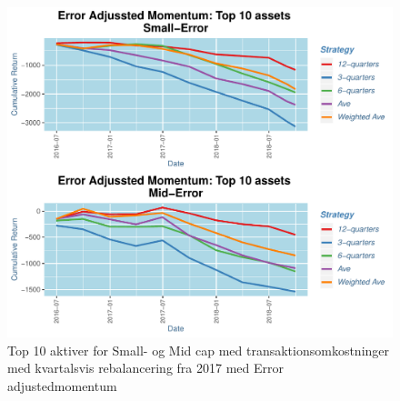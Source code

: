 \documentclass[]{article}
\begin{document}
\begin{figure}
\centering
\includegraphics{IPA_Small_and_Mid_files/figure-latex/fig7-1.pdf}
\caption{\label{fig:Opdelt2017QErr}Top 10 aktiver for Small- og Mid cap
med transaktionsomkostninger med kvartalsvis rebalancering fra 2017 med
Error adjustedmomentum}
\end{figure}
\end{document}
